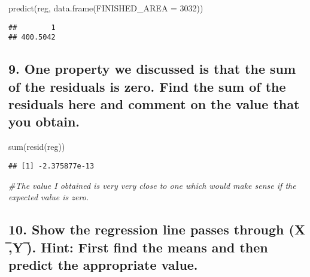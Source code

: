 \documentclass[
]{article}
\newenvironment{Shaded}{\begin{snugshade}}{\end{snugshade}}
\newcommand{\AttributeTok}[1]{\textcolor[rgb]{0.77,0.63,0.00}{#1}}
\newcommand{\CommentTok}[1]{\textcolor[rgb]{0.56,0.35,0.01}{\textit{#1}}}
\newcommand{\DecValTok}[1]{\textcolor[rgb]{0.00,0.00,0.81}{#1}}
\newcommand{\FunctionTok}[1]{\textcolor[rgb]{0.00,0.00,0.00}{#1}}
\newcommand{\NormalTok}[1]{#1}
\begin{document}
\begin{Shaded}
\begin{Highlighting}[]
\FunctionTok{predict}\NormalTok{(reg, }\FunctionTok{data.frame}\NormalTok{(}\AttributeTok{FINISHED\_AREA =} \DecValTok{3032}\NormalTok{))}
\end{Highlighting}
\end{Shaded}

\begin{verbatim}
##        1 
## 400.5042
\end{verbatim}

\hypertarget{one-property-we-discussed-is-that-the-sum-of-the-residuals-is-zero.-find-the-sum-of-the-residuals-here-and-comment-on-the-value-that-you-obtain.}{%
\subsection{9. One property we discussed is that the sum of the
residuals is zero. Find the sum of the residuals here and comment on the
value that you
obtain.}\label{one-property-we-discussed-is-that-the-sum-of-the-residuals-is-zero.-find-the-sum-of-the-residuals-here-and-comment-on-the-value-that-you-obtain.}}

\begin{Shaded}
\begin{Highlighting}[]
\FunctionTok{sum}\NormalTok{(}\FunctionTok{resid}\NormalTok{(reg))}
\end{Highlighting}
\end{Shaded}

\begin{verbatim}
## [1] -2.375877e-13
\end{verbatim}

\begin{Shaded}
\begin{Highlighting}[]
\CommentTok{\#The value I obtained is very very close to one which would make sense if the expected value is zero. }
\end{Highlighting}
\end{Shaded}

\hypertarget{show-the-regression-line-passes-through-x-y-.-hint-first-find-the-means-and-then-predict-the-appropriate-value.}{%
\subsection{10. Show the regression line passes through (X ̅,Y ̅). Hint:
First find the means and then predict the appropriate
value.}\label{show-the-regression-line-passes-through-x-y-.-hint-first-find-the-means-and-then-predict-the-appropriate-value.}}
\end{document}
